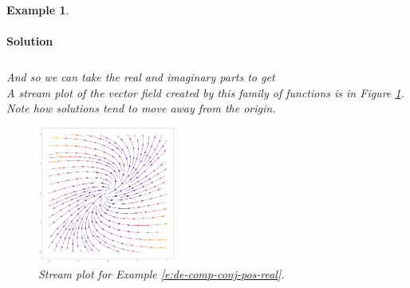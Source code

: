 \documentclass[letterpaper, 11pt, openany]{book}
\theoremstyle{mytheoremstyle}
\theoremstyle{myexamplestyle}
\newtheorem{example}{Example}[section]
\newenvironment{solution}{\paragraph{\sffamily \smaller \fontseries{b}\selectfont Solution}}{\hfill\faSquare}
\begin{document}
\begin{example}
\begin{solution}
\begin{align*}
        \end{align*}
        And so we can take the real and imaginary parts to get\[\]
        A stream plot of the vector field created by this family of functions is in Figure \ref{f:de-comp-conj-pos-real}. Note how solutions tend to move away from the origin.
        \begin{figure}[htbp]
            \centering
                \includegraphics[width=0.4\textwidth]{Figures/de-stream-complex-pos-re.pdf}
            \caption{Stream plot for Example \ref{e:de-comp-conj-pos-real}.}
            \label{f:de-comp-conj-pos-real}
        \end{figure}
    \end{solution}
\end{example}
\end{document}
